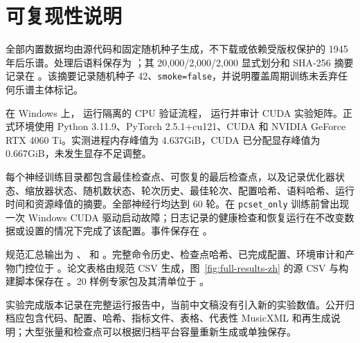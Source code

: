 \section{可复现性说明}
\label{sec:reproducibility-zh}

全部内置数据均由源代码和固定随机种子生成，不下载或依赖受版权保护的 1945 年后乐谱。处理后语料保存为 ；其 20,000/2,000/2,000 显式划分和 SHA-256 摘要记录在 。该摘要记录随机种子 42、\texttt{smoke=false}，并说明覆盖周期训练未丢弃任何乐谱主体标记。

在 Windows 上， 运行隔离的 CPU 验证流程， 运行并审计 CUDA 实验矩阵。正式环境使用 Python 3.11.9、PyTorch 2.5.1+cu121、CUDA 和 NVIDIA GeForce RTX 4060 Ti。实测进程内存峰值为 4.637GiB，CUDA 已分配显存峰值为 0.667GiB，未发生显存不足调整。

每个神经训练目录都包含最佳检查点、可恢复的最后检查点，以及记录优化器状态、缩放器状态、随机数状态、轮次历史、最佳轮次、配置哈希、语料哈希、运行时间和资源峰值的摘要。全部神经行均达到 60 轮。在 \texttt{pcset\_only} 训练前曾出现一次 Windows CUDA 驱动启动故障；日志记录的健康检查和恢复运行在不改变数据或设置的情况下完成了该配置。事件保存在 。

规范汇总输出为 、 和 。完整命令历史、检查点哈希、已完成配置、环境审计和产物门控位于 。论文表格由规范 CSV 生成，图~\ref{fig:full-results-zh} 的源 CSV 与构建脚本保存在 。20 样例专家包及其清单位于 。

实验完成版本记录在完整运行报告中，当前中文稿没有引入新的实验数值。公开归档应包含代码、配置、哈希、指标文件、表格、代表性 MusicXML 和再生成说明；大型张量和检查点可以根据归档平台容量重新生成或单独保存。
